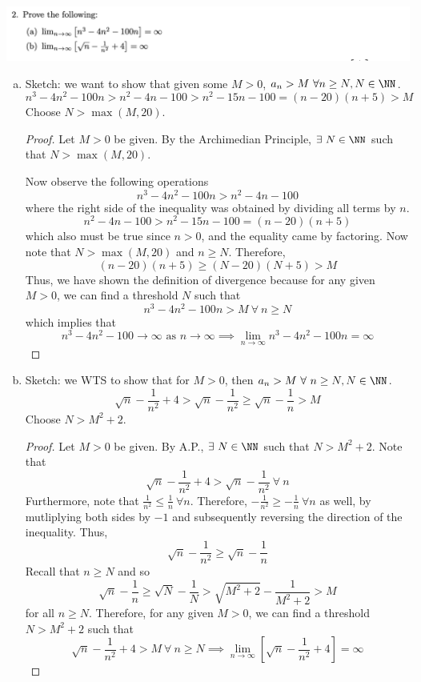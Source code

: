 \documentclass[12pt]{scrartcl}
\begin{document}
\newpage

\includegraphics[width=15cm]{2.png}

\begin{enumerate}[a.]
  \item Sketch: we want to show that given some $M > 0$, $a_n > M \ \forall n \geq N, N \in \NN$.
  \[n^3 - 4n^2 - 100n > n^2 - 4n - 100 > n^2 - 15n - 100 = (n-20)(n+5) > M\]
  Choose $N > \max(M, 20)$.
  
  \begin{proof}
    Let $M > 0$ be given. By the Archimedian Principle, $\exists \ N \in \NN$ such that $N > \max(M, 20)$.
    
    Now observe the following operations 
    \[n^3 - 4n^2 - 100n > n^2 - 4n - 100\]
    where the right side of the inequality was obtained by dividing all terms by $n$. 
    \[n^2 - 4n - 100 > n^2 - 15n - 100 = (n-20)(n+5)\]
    which also must be true since $n > 0$, and the equality came by factoring. Now note that 
    $N > \max(M, 20)$ and $n \geq N$. Therefore, 
    \[(n-20)(n + 5) \geq (N-20)(N+5) > M\] 
    Thus, we have shown the definition of divergence because for any given $M > 0$, we can find a threshold $N$ such that
    \[n^3 - 4n^2 - 100n > M \ \forall \ n \geq N\]
    which implies that
    \[n^3 - 4n^2 - 100 \to \infty \text{ as } n \to \infty \implies \underset{n\to\infty}{\lim}n^3 - 4n^2 - 100n = \infty\]
  \end{proof}

  \item Sketch: we WTS to show that for $M > 0$, then $a_n > M \ \forall \ n \geq N, N \in \NN$.
  \[\sqrt{n} - \frac{1}{n^2} + 4 > \sqrt{n} - \frac{1}{n^2} \geq \sqrt{n} - \frac{1}{n} > M\]
  Choose $N > M^2 + 2$.

  \begin{proof}
    Let $M > 0$ be given. By A.P., $\exists \ N \in \NN$ such that $N > M^2 + 2$.
    Note that
    \[\sqrt{n} - \frac{1}{n^2} + 4 > \sqrt{n} - \frac{1}{n^2} \ \forall \ n\]
    Furthermore, note that $\frac{1}{n^2} \leq \frac{1}{n} \ \forall n$. Therefore, 
    $-\frac{1}{n^2} \geq -\frac{1}{n} \ \forall n$ as well, by mutliplying both sides by $-1$ 
    and subsequently reversing the direction of the inequality. Thus, 
    \[\sqrt{n} - \frac{1}{n^2} \geq \sqrt{n} - \frac{1}{n}\]
    Recall that $n \geq N$ and so 
    \[\sqrt{n} - \frac{1}{n} \geq \sqrt{N} - \frac{1}{N} > \sqrt{M^2 + 2} - \frac{1}{M^2 + 2} > M\]
    for all $n \geq N$. Therefore, for any given $M > 0$, we can find a threshold $N > M^2 + 2$
    such that 
    \[\sqrt{n} - \frac{1}{n^2} + 4 > M \ \forall \ n \geq N \implies \lim_{n\to\infty}\left[\sqrt{n} - \frac{1}{n^2} + 4 \right] = \infty\]
  \end{proof}

\end{enumerate}
\end{document}
